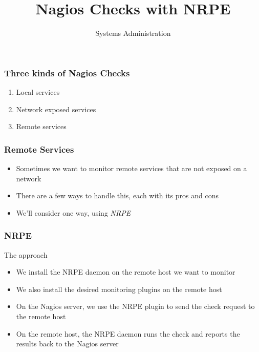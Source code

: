 \documentclass[10pt]{beamer}
\title{Nagios Checks with NRPE}
\author[IN719]{Systems Administration}
\institute[Otago Polytechnic]{
  Otago Polytechnic \\
  Dunedin, New Zealand \\
}
\date{}
\begin{document}
\begin{frame}[plain]
  \titlepage
\end{frame}

\begin{frame}
  \frametitle{Three kinds of Nagios Checks}


\begin{enumerate}
  \item Local services
  \item Network exposed services
  \item Remote services
\end{enumerate}

\end{frame}


\begin{frame}
  \frametitle{Remote Services}


\begin{itemize}
  \item Sometimes we want to monitor remote services that are not exposed on a network
  \item There are a few ways to handle this, each with its pros and cons
  \item We'll consider one way, using \emph{NRPE}
\end{itemize}

\end{frame}

\begin{frame}
  \frametitle{NRPE}

The approach
\begin{itemize}
  \item We install the NRPE daemon on the remote host we want to monitor
  \item We also install the desired monitoring plugins on the remote host
  \item On the Nagios server, we use the NRPE plugin to send the check request
        to the remote host
  \item On the remote host, the NRPE daemon runs the check and reports the results
        back to the Nagios server
\end{itemize}
\end{frame}
\end{document}

